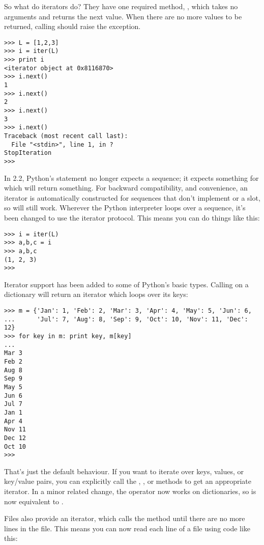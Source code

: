 \documentclass{howto}
\begin{document}
So what do iterators do?  They have one required method,
, which takes no arguments and returns the next value.
When there are no more values to be returned, calling 
should raise the  exception.

\begin{verbatim}
>>> L = [1,2,3]
>>> i = iter(L)
>>> print i
<iterator object at 0x8116870>
>>> i.next()
1
>>> i.next()
2
>>> i.next()
3
>>> i.next()
Traceback (most recent call last):
  File "<stdin>", line 1, in ?
StopIteration
>>>      
\end{verbatim}

In 2.2, Python's  statement no longer expects a sequence;
it expects something for which  will return something.
For backward compatibility, and convenience, an iterator is
automatically constructed for sequences that don't implement
 or a  slot, so  will still work.  Wherever the Python interpreter loops over
a sequence, it's been changed to use the iterator protocol.  This
means you can do things like this:

\begin{verbatim}
>>> i = iter(L)
>>> a,b,c = i
>>> a,b,c
(1, 2, 3)
>>>
\end{verbatim}

Iterator support has been added to some of Python's basic types.  
Calling  on a dictionary will return an iterator
which loops over its keys:

\begin{verbatim}
>>> m = {'Jan': 1, 'Feb': 2, 'Mar': 3, 'Apr': 4, 'May': 5, 'Jun': 6,
...      'Jul': 7, 'Aug': 8, 'Sep': 9, 'Oct': 10, 'Nov': 11, 'Dec': 12}
>>> for key in m: print key, m[key]
...
Mar 3
Feb 2
Aug 8
Sep 9
May 5
Jun 6
Jul 7
Jan 1
Apr 4
Nov 11
Dec 12
Oct 10
>>>
\end{verbatim}          

That's just the default behaviour.  If you want to iterate over keys,
values, or key/value pairs, you can explicitly call the
, , or 
methods to get an appropriate iterator.  In a minor related change,
the  operator now works on dictionaries, so
 is now equivalent to
.


Files also provide an iterator, which calls the 
method until there are no more lines in the file.  This means you can
now read each line of a file using code like this:
\end{document}
